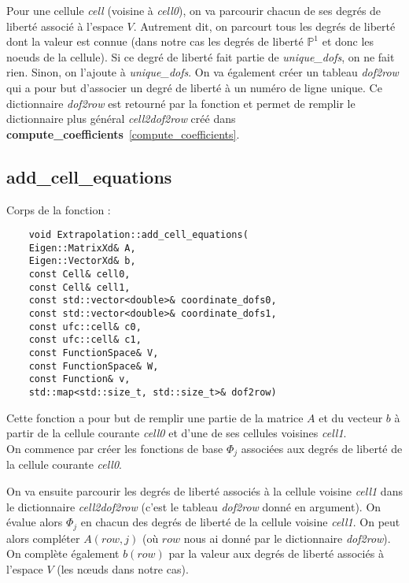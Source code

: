 Pour une cellule \textit{cell} (voisine à \textit{cell0}), on va parcourir chacun de ses degrés de liberté associé à l'espace $V$. Autrement dit, on parcourt tous les degrés de liberté dont la valeur est connue (dans notre cas les degrés de liberté $\mathbb{P}^1$ et donc les noeuds de la cellule). Si ce degré de liberté fait partie de \textit{unique\_dofs}, on ne fait rien. Sinon, on l'ajoute à \textit{unique\_dofs}. On va également créer un tableau \textit{dof2row} qui a pour but d'associer un degré de liberté à un numéro de ligne unique. Ce dictionnaire \textit{dof2row} est retourné par la fonction et permet de remplir le dictionnaire plus général \textit{cell2dof2row} créé dans \textbf{compute\_coefficients}~\ref{compute_coefficients}.

\subsection{add\_cell\_equations}
\label{add_cell_equations}

Corps de la fonction :

\begin{lstlisting}
	void Extrapolation::add_cell_equations(
	Eigen::MatrixXd& A,
	Eigen::VectorXd& b,
	const Cell& cell0,
	const Cell& cell1,
	const std::vector<double>& coordinate_dofs0,
	const std::vector<double>& coordinate_dofs1,
	const ufc::cell& c0,
	const ufc::cell& c1,
	const FunctionSpace& V,
	const FunctionSpace& W,
	const Function& v,
	std::map<std::size_t, std::size_t>& dof2row)
\end{lstlisting}

Cette fonction a pour but de remplir une partie de la matrice $A$ et du vecteur $b$ à partir de la cellule courante \textit{cell0} et d'une de ses cellules voisines \textit{cell1}. \\

On commence par créer les fonctions de base $\Phi_j$ associées aux degrés de liberté de la cellule courante \textit{cell0}.

On va ensuite parcourir les degrés de liberté associés à la cellule voisine \textit{cell1} dans le dictionnaire \textit{cell2dof2row} (c'est le tableau \textit{dof2row} donné en argument). On évalue alors $\Phi_j$ en chacun des degrés de liberté de la cellule voisine \textit{cell1}. On peut alors compléter $A(row,j)$ (où $row$ nous ai donné par le dictionnaire \textit{dof2row}). On complète également $b(row)$ par la valeur aux degrés de liberté associés à l'espace $V$ (les nœuds dans notre cas). 

